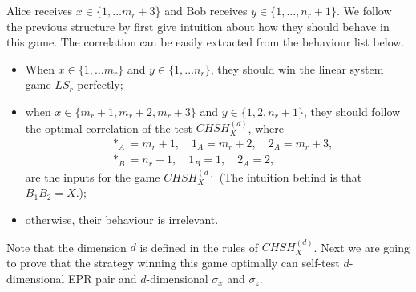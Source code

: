 \documentclass[11pt,letterpaper]{article}
\newcommand{\ket}[1]{|#1\rangle}
\newcommand{\ketbra}[2]{|#1\rangle\langle#2|}
\newcommand{\x}{\otimes}
\newcommand{\1}{\mathbb{1}}
\newcommand{\CHSH}{CHSH^{(d)}}
\theoremstyle{definition}
\begin{document}
Alice receives $x \in \{1,\dots m_r+3 \}$ and Bob receives
$y \in \{1,\dots,n_r+1\}$. We follow the previous structure by first give intuition about how they should
behave in this game. The correlation can be easily extracted from the behaviour list below.
\begin{itemize}
	\item When $x \in \{1,\dots m_r\}$ and $y \in \{1, \dots n_r\}$, they should win the 
	linear system game $LS_r$ perfectly;
	\item when $x \in \{m_r+1, m_r+2, m_r+3\}$ and $y \in \{1, 2, n_r+1\}$, they should follow the
	optimal correlation of the test $\CHSH_X$, where 
	\begin{align}
		&\ast_A = m_r+1, \quad 1_A = m_r+2,\quad 2_A = m_r+3,\\
		&\ast_B = n_r+1,\quad 1_B = 1, \quad 2_A = 2,
	\end{align}
	are the inputs for the game $\CHSH_X$
	(The intuition behind is that $B_1B_2 = X$.);
	\item otherwise, their behaviour is irrelevant.
\end{itemize}
Note that the dimension $d$ is defined in the rules of $\CHSH_X$.
Next we are going to prove that the strategy winning this game optimally can self-test $d$-dimensional EPR pair and 
$d$-dimensional $\sigma_x$ and $\sigma_z$.
\end{document}
